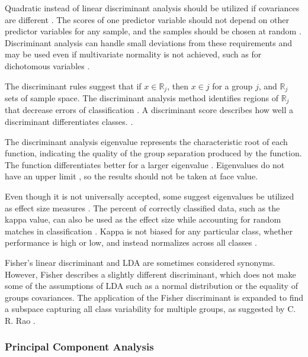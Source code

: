 \documentclass[sn-mathphys-num]{sn-jnl}%
\begin{document}
Quadratic instead of linear discriminant analysis should be utilized if covariances are different \cite{cokluk2008discriminant}. The scores of one predictor variable should not depend on other predictor variables for any sample, and the samples should be chosen at random \cite{cokluk2008discriminant, hansen2005using}. Discriminant analysis can handle small deviations from these requirements \cite{lachenbruch1979discriminant} and may be used even if multivariate normality is not achieved, such as for dichotomous variables \cite{klecka1980discriminant}.

The discriminant rules suggest that if $x\in \mathbb{R}_{j}$, then $x\in j$ for a group $j$, and $\mathbb{R}_{j}$ sets of sample space. The discriminant analysis method identifies regions of $\mathbb{R}_{j}$ that decrease errors of classification \cite{Hardle2003AppliedMS}. A discriminant score describes how well a discriminant differentiates classes. \cite{archive765Discriminant}.
 
The discriminant analysis eigenvalue represents the characteristic root of each function, indicating the quality of the group separation produced by the function. The function differentiates better for a larger eigenvalue \cite{cokluk2008discriminant}. Eigenvalues do not have an upper limit \cite{cokluk2008discriminant, hansen2005using}, so the results should not be taken at face value.

Even though it is not universally accepted, some suggest eigenvalues be utilized as effect size measures \cite{hansen2005using}. The percent of correctly classified data, such as the kappa value, can also be used as the effect size while accounting for random matches in classification \cite{hansen2005using}. Kappa is not biased for any particular class, whether performance is high or low, and instead normalizes across all classes \cite{israel2006performance}. 

Fisher's linear discriminant and LDA are sometimes considered synonyms. However, Fisher \cite{fisher1936use} describes a slightly different discriminant, which does not make some of the assumptions of LDA such as a normal distribution or the equality of groups covariances. The application of the Fisher discriminant is expanded to find a subspace capturing all class variability \cite{archive765Discriminant} for multiple groups, as suggested by C. R. Rao \cite{rao1948utilization}.

\subsubsection{Principal Component Analysis}
\end{document}
